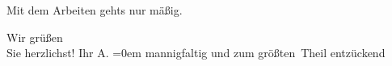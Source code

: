 \pstart
           {\pb}Mit dem Arbeiten gehts nur mäßig.\pend
           
\pstart
           Wir grüßen{\\[\baselineskip]}Sie herzlichst! Ihr \spacefill\mbox{A.}\pend
           \leftskip=0em{}
\pstart
           \noindent{}mannigfaltig und zum größten Theil entzückend\pend
           \endnumbering{}
\begin{anhang}
\end{anhang}\newcommand{\dateiname}{L04404}\newcommand{\titel}{Arthur Schnitzler an Gustav Schwarzkopf, [13. oder 14]. 8. 1916}\newcommand{\editorInnen}{Herausgegeben von Jahnke, SelmaMüller, Martin Anton}
